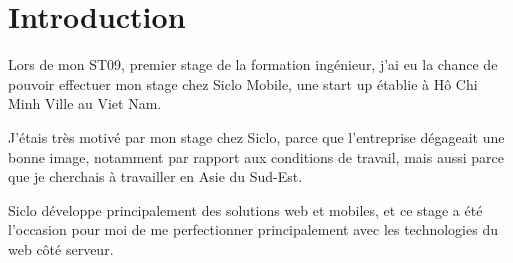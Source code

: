 \documentclass[main.tex]{subfiles}
\begin{document}
    \section*{Introduction}
    Lors de mon ST09, premier stage de la formation ingénieur,
    j'ai eu la chance de pouvoir effectuer mon stage chez Siclo Mobile,
    une start up établie à Hô Chi Minh Ville au Viet Nam.

    J'étais très motivé par mon stage chez Siclo, parce que l'entreprise dégageait une bonne image, notamment par rapport aux conditions de travail, mais aussi parce que je cherchais à travailler en Asie du Sud-Est.

    Siclo développe principalement des solutions web et mobiles, et ce stage a été l'occasion pour moi de me perfectionner principalement avec les technologies du web côté serveur.
\end{document}
